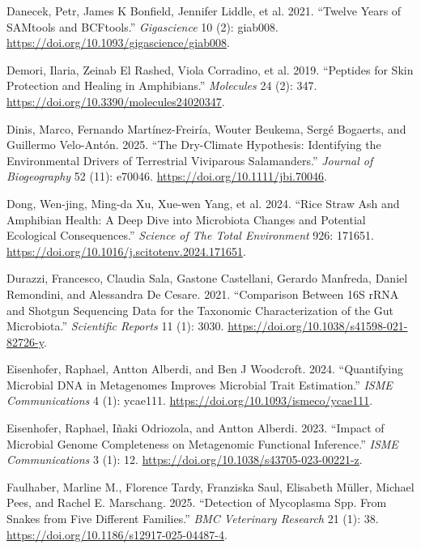 \documentclass[
  12pt,
]{article}
\newlength{\cslhangindent}
\newenvironment{CSLReferences}[2] %
 {\begin{list}{}{%
  \setlength{\itemindent}{0pt}
  \setlength{\leftmargin}{0pt}
  \setlength{\parsep}{0pt}
  \ifodd #1
   \setlength{\leftmargin}{\cslhangindent}
   \setlength{\itemindent}{-1\cslhangindent}
  \fi
  \setlength{\itemsep}{#2\baselineskip}}}
 {\end{list}}
\begin{document}
\begin{CSLReferences}{1}{1}
{Danecek, Petr, James K Bonfield, Jennifer Liddle, et al.} 2021.
{``Twelve Years of {SAMtools} and {BCFtools}.''} \emph{Gigascience} 10
(2): giab008. \url{https://doi.org/10.1093/gigascience/giab008}.

{Demori, Ilaria, Zeinab El Rashed, Viola Corradino, et al.} 2019.
{``Peptides for Skin Protection and Healing in Amphibians.''}
\emph{Molecules} 24 (2): 347.
\url{https://doi.org/10.3390/molecules24020347}.

Dinis, Marco, Fernando Martínez-Freiría, Wouter Beukema, Sergé Bogaerts,
and Guillermo Velo-Antón. 2025. {``The {Dry}-{Climate} {Hypothesis}:
{Identifying} the {Environmental} {Drivers} of {Terrestrial}
{Viviparous} {Salamanders}.''} \emph{Journal of Biogeography} 52 (11):
e70046. \url{https://doi.org/10.1111/jbi.70046}.

Dong, Wen-jing, Ming-da Xu, Xue-wen Yang, et al. 2024. {``Rice Straw Ash
and Amphibian Health: {A} Deep Dive into Microbiota Changes and
Potential Ecological Consequences.''} \emph{Science of The Total
Environment} 926: 171651.
\url{https://doi.org/10.1016/j.scitotenv.2024.171651}.

Durazzi, Francesco, Claudia Sala, Gastone Castellani, Gerardo Manfreda,
Daniel Remondini, and Alessandra De Cesare. 2021. {``Comparison Between
{16S} {rRNA} and Shotgun Sequencing Data for the Taxonomic
Characterization of the Gut Microbiota.''} \emph{Scientific Reports} 11
(1): 3030. \url{https://doi.org/10.1038/s41598-021-82726-y}.

Eisenhofer, Raphael, Antton Alberdi, and Ben J Woodcroft. 2024.
{``Quantifying Microbial {DNA} in Metagenomes Improves Microbial Trait
Estimation.''} \emph{ISME Communications} 4 (1): ycae111.
\url{https://doi.org/10.1093/ismeco/ycae111}.

Eisenhofer, Raphael, Iñaki Odriozola, and Antton Alberdi. 2023.
{``Impact of Microbial Genome Completeness on Metagenomic Functional
Inference.''} \emph{ISME Communications} 3 (1): 12.
\url{https://doi.org/10.1038/s43705-023-00221-z}.

Faulhaber, Marline M., Florence Tardy, Franziska Saul, Elisabeth Müller,
Michael Pees, and Rachel E. Marschang. 2025. {``Detection of
{Mycoplasma} Spp. From Snakes from Five Different Families.''} \emph{BMC
Veterinary Research} 21 (1): 38.
\url{https://doi.org/10.1186/s12917-025-04487-4}.


\end{CSLReferences}
\end{document}
